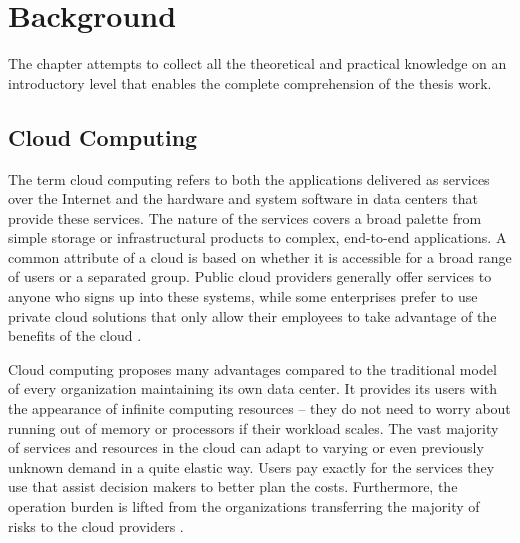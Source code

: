 \chapter{Background} \label{background}

The chapter attempts to collect all the theoretical and practical knowledge on an introductory level that enables the complete comprehension of the thesis work.


\section{Cloud Computing}

The term cloud computing refers to both the applications delivered as services over the Internet and the hardware and system software in data centers that provide these services. The nature of the services covers a broad palette from simple storage or infrastructural products to complex, end-to-end applications. A common attribute of a cloud is based on whether it is accessible for a broad range of users or a separated group. Public cloud providers generally offer services to anyone who signs up into these systems, while some enterprises prefer to use private cloud solutions that only allow their employees to take advantage of the benefits of the cloud \cite{AboveTheClouds}.

Cloud computing proposes many advantages compared to the traditional model of every organization maintaining its own data center. It provides its users with the appearance of infinite computing resources -- they do not need to worry about running out of memory or processors if their workload scales. The vast majority of services and resources in the cloud can adapt to varying or even previously unknown demand in a quite elastic way. Users pay exactly for the services they use that assist decision makers to better plan the costs. Furthermore, the operation burden is lifted from the organizations transferring the majority of risks to the cloud providers \cite{AboveTheClouds}.


